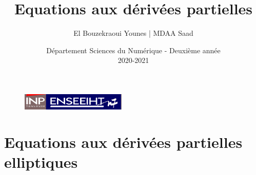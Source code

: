 \documentclass{article}
\begin{document}
\begin{figure}[t]
\centering
\includegraphics[width=5cm]{inp_n7.png}
\end{figure}

\title{\vspace{4cm} \textbf{Equations aux dérivées partielles}}
\author{El Bouzekraoui Younes | MDAA Saad}
\date{\vspace{7cm} Département Sciences du Numérique - Deuxième année \\
2020-2021 }

\maketitle

\newpage
\tableofcontents

\newpage
\section{Equations aux dérivées partielles elliptiques}
\end{document}
